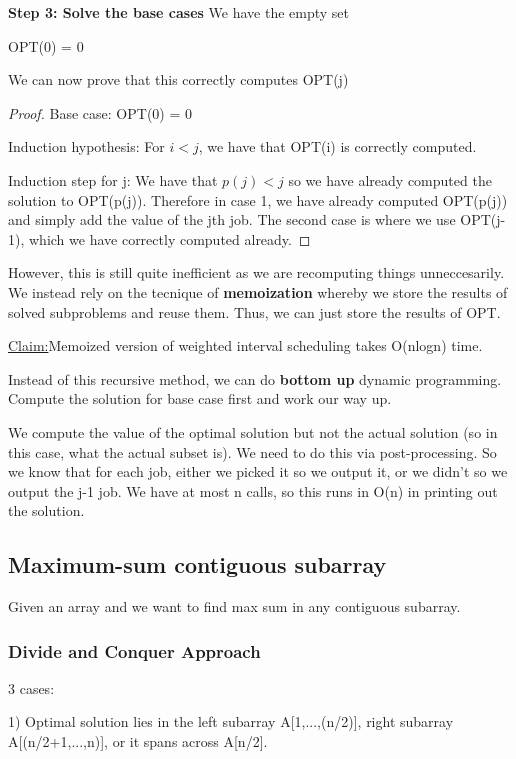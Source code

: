\documentclass[11pt, oneside]{article}
\theoremstyle{definition}
\newenvironment{claim}[1]{\par\noindent\underline{Claim:}\space#1}{}
\begin{document}
\textbf{Step 3: Solve the base cases}
We have the empty set
\begin{center}
  OPT(0) = 0
\end{center}

We can now prove that this correctly computes OPT(j)
\begin{proof}
  Base case: OPT(0) = 0

  Induction hypothesis: For $i < j$, we have that OPT(i) is correctly computed.

  Induction step for j: We have that $p(j) < j$ so we have already computed the solution to OPT(p(j)). Therefore in case 1, we have already computed OPT(p(j)) and simply add the value of the jth job. The second case is where we use OPT(j-1), which we have correctly computed already.
\end{proof}

However, this is still quite inefficient as we are recomputing things unneccesarily. We instead rely on the tecnique of \textbf{memoization} whereby we store the results of solved subproblems and reuse them. Thus, we can just store the results of OPT.

\begin{claim}
  Memoized version of weighted interval scheduling takes O(nlogn) time.
\end{claim}

Instead of this recursive method, we can do \textbf{bottom up} dynamic programming. Compute the solution for base case first and work our way up.

We compute the value of the optimal solution but not the actual solution (so in this case, what the actual subset is). We need to do this via post-processing. So we know that for each job, either we picked it so we output it, or we didn't so we output the j-1 job. We have at most n calls, so this runs in O(n) in printing out the solution.

\subsection{Maximum-sum contiguous subarray}
Given an array and we want to find max sum in any contiguous subarray.

\subsubsection{Divide and Conquer Approach}
3 cases:

1) Optimal solution lies in the left subarray A[1,...,(n/2)], right subarray A[(n/2+1,...,n)], or it spans across A[n/2].
\end{document}
